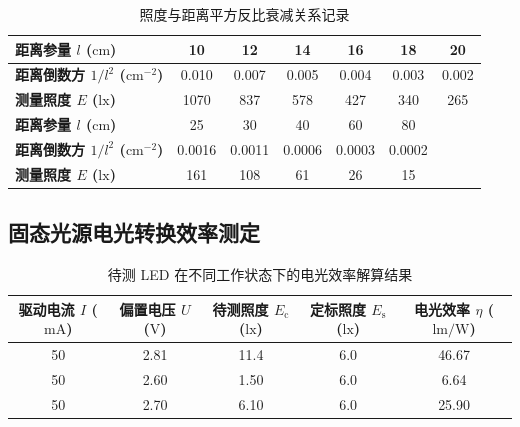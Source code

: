 \documentclass[12pt, a4paper]{article}
\begin{document}
\begin{table}[H]
    \centering
    \caption{照度与距离平方反比衰减关系记录}
    \begin{tabular}{lcccccc}
        \toprule
        \textbf{距离参量 $l$ ($\mathrm{cm}$)} & 10 & 12 & 14 & 16 & 18 & 20 \\ 
        \midrule
        \textbf{距离倒数方 $1/l^2$ ($\mathrm{cm}^{-2}$)} & 0.010 & 0.007 & 0.005 & 0.004 & 0.003 & 0.002 \\ 
        \textbf{测量照度 $E$ ($\mathrm{lx}$)} & 1070 & 837 & 578 & 427 & 340 & 265 \\ 
        \bottomrule
        \toprule
        \textbf{距离参量 $l$ ($\mathrm{cm}$)} & 25 & 30 & 40 & 60 & 80 & \\
        \midrule
        \textbf{距离倒数方 $1/l^2$ ($\mathrm{cm}^{-2}$)} & 0.0016 & 0.0011 & 0.0006 & 0.0003 & 0.0002 & \\
        \textbf{测量照度 $E$ ($\mathrm{lx}$)} & 161 & 108 & 61 & 26 & 15 & \\
        \bottomrule
    \end{tabular}
\end{table}

\subsection{固态光源电光转换效率测定}
\begin{table}[H]
    \centering
    \caption{待测 LED 在不同工作状态下的电光效率解算结果}
    \begin{tabular}{ccccc}
        \toprule
        \textbf{驱动电流 $I$ ($\mathrm{mA}$)} & \textbf{偏置电压 $U$ ($\mathrm{V}$)} & \textbf{待测照度 $E_{\mathrm{c}}$ ($\mathrm{lx}$)} & \textbf{定标照度 $E_{\mathrm{s}}$ ($\mathrm{lx}$)} & \textbf{电光效率 $\eta$ ($\mathrm{lm/W}$)} \\ 
        \midrule
        50 & 2.81 & 11.4 & 6.0 & 46.67 \\ 
        50 & 2.60 & 1.50 & 6.0 & 6.64 \\ 
        50 & 2.70 & 6.10 & 6.0 & 25.90 \\ 
        \bottomrule
    \end{tabular}
\end{table}
\end{document}
